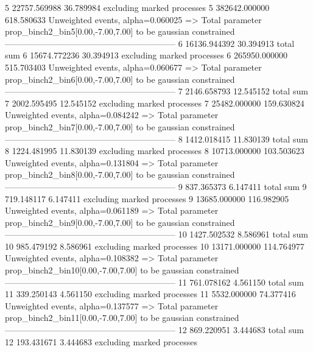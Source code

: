 5          22757.569988    36.789984       excluding marked processes    
5          382642.000000   618.580633      Unweighted events, alpha=0.060025
  => Total parameter prop_binch2_bin5[0.00,-7.00,7.00] to be gaussian constrained
------------------------------------------------------------
6          16136.944392    30.394913       total sum                     
6          15674.772236    30.394913       excluding marked processes    
6          265950.000000   515.703403      Unweighted events, alpha=0.060677
  => Total parameter prop_binch2_bin6[0.00,-7.00,7.00] to be gaussian constrained
------------------------------------------------------------
7          2146.658793     12.545152       total sum                     
7          2002.595495     12.545152       excluding marked processes    
7          25482.000000    159.630824      Unweighted events, alpha=0.084242
  => Total parameter prop_binch2_bin7[0.00,-7.00,7.00] to be gaussian constrained
------------------------------------------------------------
8          1412.018415     11.830139       total sum                     
8          1224.481995     11.830139       excluding marked processes    
8          10713.000000    103.503623      Unweighted events, alpha=0.131804
  => Total parameter prop_binch2_bin8[0.00,-7.00,7.00] to be gaussian constrained
------------------------------------------------------------
9          837.365373      6.147411        total sum                     
9          719.148117      6.147411        excluding marked processes    
9          13685.000000    116.982905      Unweighted events, alpha=0.061189
  => Total parameter prop_binch2_bin9[0.00,-7.00,7.00] to be gaussian constrained
------------------------------------------------------------
10         1427.502532     8.586961        total sum                     
10         985.479192      8.586961        excluding marked processes    
10         13171.000000    114.764977      Unweighted events, alpha=0.108382
  => Total parameter prop_binch2_bin10[0.00,-7.00,7.00] to be gaussian constrained
------------------------------------------------------------
11         761.078162      4.561150        total sum                     
11         339.250143      4.561150        excluding marked processes    
11         5532.000000     74.377416       Unweighted events, alpha=0.137577
  => Total parameter prop_binch2_bin11[0.00,-7.00,7.00] to be gaussian constrained
------------------------------------------------------------
12         869.220951      3.444683        total sum                     
12         193.431671      3.444683        excluding marked processes    
